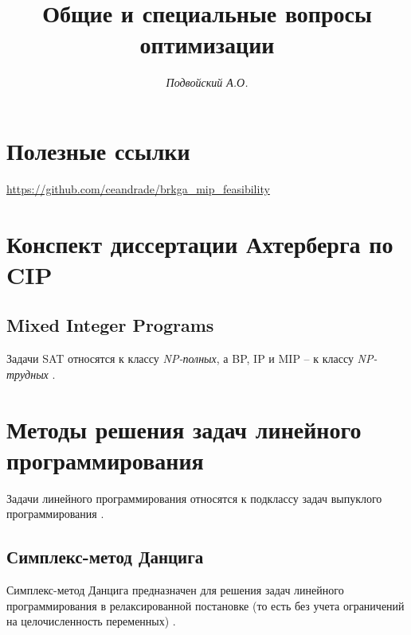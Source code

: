 \documentclass[%
	11pt,
	a4paper,
	utf8,
		]{article}
\begin{document}
\title{Общие и специальные вопросы оптимизации}

\author{\itshape Подвойский А.О.}

\date{}
\maketitle

\thispagestyle{fancy}




\tableofcontents

\section{Полезные ссылки}

\url{https://github.com/ceandrade/brkga_mip_feasibility}

\section{Конспект диссертации Ахтерберга по CIP}

\subsection{Mixed Integer Programs}

Задачи SAT относятся к классу \emph{NP-полных}, а BP, IP и MIP -- к классу \emph{NP-трудных} \cite[]{achterberg:constr_int_prog}.

\section{Методы решения задач линейного программирования}

Задачи линейного программирования относятся к подклассу задач выпуклого программирования \cite[]{vorontsova:convex_opt-2021}.

\subsection{Симплекс-метод Данцига}

Симплекс-метод Данцига предназначен для решения задач линейного программирования в релаксированной постановке (то есть без учета ограничений на целочисленность переменных) \cite[]{achterberg:constr_int_prog}.
\end{document}
